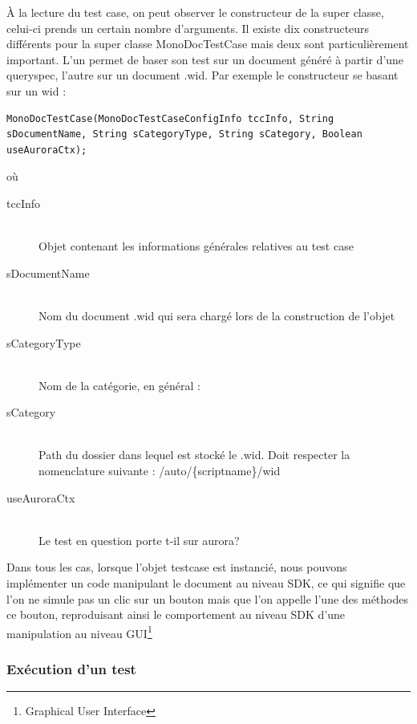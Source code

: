 \`{A} la lecture du test case, on peut observer le constructeur de la super classe, celui-ci prends un certain nombre d'arguments. Il existe dix constructeurs diff\'{e}rents pour la super classe MonoDocTestCase mais deux sont particuli\`{e}rement important. L'un permet de baser son test sur un document g\'{e}n\'{e}r\'{e} \`{a} partir d'une queryspec, l'autre sur un document .wid. Par exemple le constructeur se basant sur un wid :\\
\begin{lstlisting}
MonoDocTestCase(MonoDocTestCaseConfigInfo tccInfo, String sDocumentName, String sCategoryType, String sCategory, Boolean useAuroraCtx);
\end{lstlisting}
où
\begin{description}
	\item[tccInfo] \hfill \\
	Objet contenant les informations g\'{e}n\'{e}rales relatives au test case
	\item[sDocumentName] \hfill \\
	Nom du document .wid qui sera charg\'{e} lors de la construction de l'objet
	\item[sCategoryType] \hfill \\
	Nom de la cat\'{e}gorie, en g\'{e}n\'{e}ral : 
	\item[sCategory] \hfill \\
	Path du dossier dans lequel est stock\'{e} le .wid. Doit respecter la nomenclature suivante : /auto/\{scriptname\}/wid
	\item[useAuroraCtx] \hfill \\
	Le test en question porte t-il sur aurora?
\end{description}
 Dans tous les cas, lorsque l'objet testcase est instanci\'{e}, nous pouvons impl\'{e}menter un code manipulant le document au niveau SDK, ce qui signifie que l'on ne simule pas un clic sur un bouton mais que l'on appelle l'une des m\'{e}thodes  ce bouton, reproduisant ainsi le comportement au niveau SDK d'une manipulation au niveau GUI\footnote{Graphical User Interface}







\subsubsection{Ex\'{e}cution d'un test}


